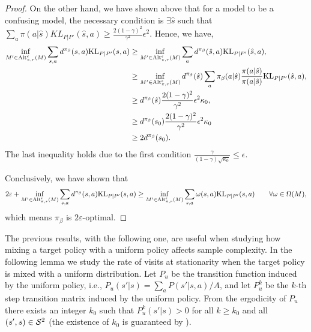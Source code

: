 \begin{proof}
    On the other hand, we have shown above that for a model to be a confusing model, the necessary condition is $\exists \hat s$ such that $\sum_a \pi(a|\hat s) KL_{P|P'}(\hat s,a)\ge \frac{2(1-\gamma)^2}{\gamma^2}\epsilon^2$. Hence, we have,
    \begin{align*}
        \inf_{M'\in {\rm Alt}_{\pi,r}^\epsilon(M)}\sum_{s,a}d^{\pi_\beta}(s,a){\rm KL}_{P|P'}(s,a)&\geq \inf_{M'\in {\rm Alt}_{\pi,r}^\epsilon(M)}\sum_a d^{\pi_\beta}(\hat s,a){\rm KL}_{P|P'}(\hat s,a),\\
        &\geq \inf_{M'\in {\rm Alt}_{\pi,r}^\epsilon(M)}d^{\pi_\beta}(\hat s)\sum_a \pi_\beta(a|\hat s)\frac{\pi(a|\hat s)}{\pi(a|\hat s)}{\rm KL}_{P|P'}(\hat s,a),\\
        &\geq d^{\pi_\beta}(\hat s)\frac{2(1-\gamma)^2}{\gamma^2}\epsilon^2 \kappa_0,\\
        &\ge d^{\pi_\beta}(s_0)\frac{2(1-\gamma)^2}{\gamma^2}\epsilon^2 \kappa_0\\
        &\ge 2d^{\pi_\beta}(s_0).
    \end{align*}
    The last inequality holds due to the first condition $\frac{\gamma}{(1-\gamma)\sqrt{\kappa_0}}\le \epsilon$.

    Conclusively, we have shown that 
    \begin{align*}
       2\varepsilon+ \inf_{M'\in {\rm Alt}_{\pi,r}^\epsilon(M)}\sum_{s,a}d^{\pi_\beta}(s,a){\rm KL}_{P|P'}(s,a)\ge \inf_{M'\in {\rm Alt}_{\pi,r}^\epsilon(M)}\sum_{s,a}\omega(s,a){\rm KL}_{P|P'}(s,a)\qquad  \forall \omega\in\Omega(M),
    \end{align*}
    which means $\pi_\beta$ is $2\varepsilon$-optimal.
\end{proof}


The previous results, with the following one, are useful when studying how mixing a target policy with a uniform policy affects sample complexity.
In the following lemma we study the rate of visits at stationarity when the target policy is mixed with a uniform distribution. Let $P_u$ be the transition function induced by the uniform policy, i.e., $P_u(s'|s) = \sum_a P(s'|s,a)/A$, and let $P_u^k$ be the $k$-th step transition matrix induced by the uniform policy. From the ergodicity of $P_u$ there exists an integer $k_0$ such that $P_u^k(s'|s)>0$ for all $k\geq k_0$ and all $(s',s)\in {\cal S}^2$ (the existence of $k_0$ is guaranteed by \citet[Proposition 1.7]{levin2017markov}).


